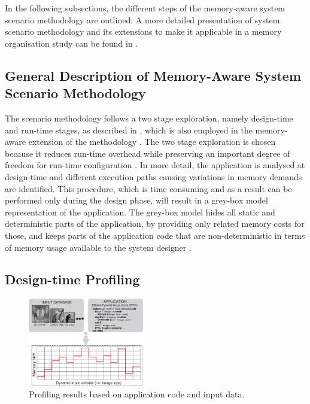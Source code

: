 \documentclass[a4paper,conference]{IEEEtran}
\begin{document}
In the following subsections, the different steps of the memory-aware system scenario methodology are outlined. A more detailed presentation of system scenario methodology and its extensions to make it applicable in a memory organisation study can be found in \cite{Fil12}.

\subsection{General Description of Memory-Aware System Scenario Methodology}

The scenario methodology follows a two stage exploration, namely design-time and run-time stages, as described in \cite{Gheorghita2007}, which is also employed in the memory-aware extension of the methodology \cite{Fil12}. The two stage exploration is chosen because it reduces run-time overhead while preserving an important degree of freedom for run-time configuration \cite{tcm}. In more detail, the application is analysed at design-time and different execution paths causing variations in memory demands are identified. This procedure, which is time consuming and as a result can be performed only during the design phase, will result in a grey-box model representation of the application. The grey-box model hides all static and deterministic parts of the application, by providing only related memory costs for those, and keeps parts of the application code that are non-deterministic in terms of memory usage available to the system designer \cite{graybox}. 


\subsection{Design-time Profiling}

\begin{figure}[!t]
\centering
\includegraphics[width=0.45\textwidth]{Images/profiling.eps}
\caption{Profiling results based on application code and input data.}
\label{fig:profiling}
\end{figure}
\end{document}

